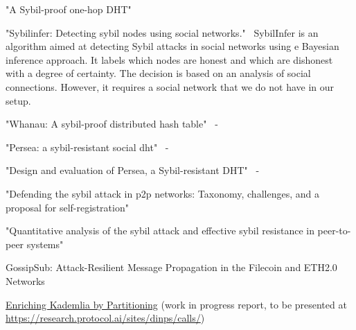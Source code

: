 "A Sybil-proof one-hop DHT"~\cite{lesniewski2008sybil}



"Sybilinfer: Detecting sybil nodes using social networks."~\cite{danezis2009sybilinfer}
SybilInfer is an algorithm aimed at detecting Sybil attacks in social networks using e Bayesian inference approach.  It  labels which nodes are honest and which are dishonest with a degree of certainty. The decision is based on an analysis of social connections. However, it requires a social network that we do not have in our setup. 

"Whanau: A sybil-proof distributed hash table"~\cite{lesniewski2010whanau} - 


"Persea: a sybil-resistant social dht"~\cite{al2013persea} - 


"Design and evaluation of Persea, a Sybil-resistant DHT"~\cite{al2014design} - 

"Defending the sybil attack in p2p networks: Taxonomy, challenges, and a proposal for self-registration"~\cite{dinger2006defending}


"Quantitative analysis of the sybil attack and effective sybil resistance in peer-to-peer systems"~\cite{jetter2010quantitative}


GossipSub: Attack-Resilient Message Propagation in
the Filecoin and ETH2.0 Networks

\href{https://asc.di.fct.unl.pt/~jleitao/pdf/dinps22-tr.pdf}{Enriching Kademlia by Partitioning} (work in progress report, to be presented at \href{DINPS2022 by Protocol Labs}{https://research.protocol.ai/sites/dinps/calls/})
\fi
